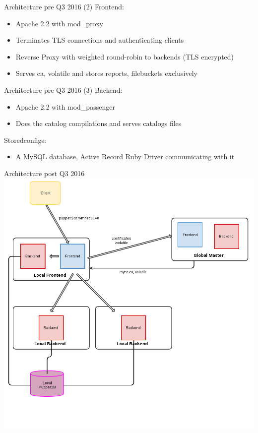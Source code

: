\documentclass{beamer}
\begin{document}
    \begin{frame}{Architecture pre Q3 2016 (2)}
        Frontend:
        \begin{itemize}
            \pause \item Apache 2.2 with mod\_proxy
            \pause \item Terminates TLS connections and authenticating clients
            \pause \item Reverse Proxy with weighted round-robin to backends (TLS encrypted)
            \pause \item Serves ca, volatile and stores reports, filebuckets exclusively
        \end{itemize}
    \end{frame}
    \begin{frame}{Architecture pre Q3 2016 (3)}
        Backend:
        \begin{itemize}
            \pause \item Apache 2.2 with mod\_passenger
            \pause \item Does the catalog compilations and serves catalogs files
        \end{itemize}
        \pause Storedconfigs:
        \begin{itemize}
            \pause \item A MySQL database, Active Record Ruby Driver communicating with it
        \end{itemize}
    \end{frame}
    \begin{frame}{Architecture post Q3 2016}
        \includegraphics[width=\textwidth, height=\textheight]{Puppet-diagram_post_q3_2016.png}
    \end{frame}
\end{document}
